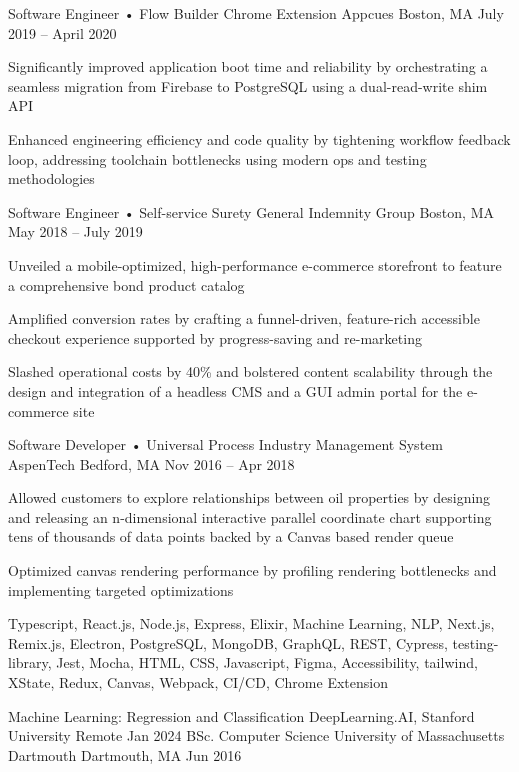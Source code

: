 \documentclass[]{awesome-cv}
\begin{document}
\begin{cventries}
{\begin{cvitems}
		\end{cvitems}}
	\cventry
	{Software Engineer • Flow Builder Chrome Extension}
	{Appcues}
	{Boston, MA}
	{July 2019 – April 2020}
	{\begin{cvitems}
		\item {Significantly improved application boot time and reliability by orchestrating a seamless migration from Firebase to PostgreSQL using a dual-read-write shim API}
		\item {Enhanced engineering efficiency and code quality by tightening workflow feedback loop, addressing toolchain bottlenecks using modern ops and testing methodologies}
		\end{cvitems}}
	\cventry
	{Software Engineer • Self-service Surety}
	{General Indemnity Group}
	{Boston, MA}
	{May 2018 – July 2019}
	{\begin{cvitems}
		\item {Unveiled a mobile-optimized, high-performance e-commerce storefront to feature a comprehensive bond product catalog}
		\item {Amplified conversion rates by crafting a funnel-driven, feature-rich accessible checkout experience supported by progress-saving and re-marketing}
		\item {Slashed operational costs by 40\% and bolstered content scalability through the design and integration of a headless CMS and a GUI admin portal for the e-commerce site}
		\end{cvitems}}
	\cventry
	{Software Developer • Universal Process Industry Management System} 
	{AspenTech}
	{Bedford, MA}
	{Nov 2016 – Apr 2018}
	{\begin{cvitems}
		\item {Allowed customers to explore relationships between oil properties by designing and releasing an n-dimensional interactive parallel coordinate chart supporting tens of thousands of data points backed by a Canvas based render queue}
		\item {Optimized canvas rendering performance by profiling rendering bottlenecks and implementing targeted optimizations}
		\end{cvitems}}
\end{cventries}

\vspace{-2mm}

Typescript, React.js, Node.js, Express, Elixir, Machine Learning, NLP, Next.js, Remix.js, Electron, PostgreSQL, MongoDB, GraphQL, REST, Cypress, testing-library, Jest, Mocha, HTML, CSS, Javascript, Figma, Accessibility, tailwind, XState, Redux, Canvas, Webpack, CI/CD, Chrome Extension

\begin{cvhonors}
	\cvhonor
	{Machine Learning: Regression and Classification}
	{DeepLearning.AI, Stanford University}
	{Remote}
	{Jan 2024}
	\cvhonor
	{BSc. Computer Science}
	{University of Massachusetts Dartmouth}
	{Dartmouth, MA}
	{Jun 2016}
\end{cvhonors}
\end{document}
